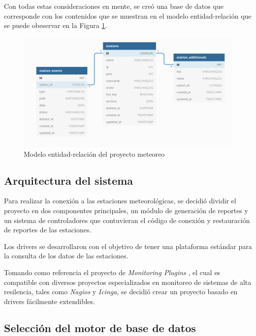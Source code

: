 Con todas estas consideraciones en mente, se creó una base de datos que corresponde con los contenidos que se muestran en el modelo entidad-relación que se puede obeservar en la Figura \ref{fig:diagrama_base_de_datos}.


\begin{figure}[!ht]
	\centering
	\includegraphics[width=0.86\linewidth]{images/diagrams/database_diagram.png}
	\caption{Modelo entidad-relación del proyecto meteoreo}
	\label{fig:diagrama_base_de_datos}
\end{figure}

\subsection{Arquitectura del sistema}

Para realizar la conexión a las estaciones meteorológicas, se decidió dividir el proyecto en dos componentes principales, un módulo de generación de reportes y un sistema de controladores que contuvieran el código de conexión y restauración de reportes de las estaciones.

Los drivers se desarrollaron con el objetivo de tener una plataforma estándar para la consulta de los datos de las estaciones.

Tomando como referencia el proyecto de \textit{Monitoring Plugins} \cite{monitoring_plugins}, el cual es compatible con diversos proyectos especializados en monitoreo de sistemas de alta resilencia, tales como \textit{Nagios} y \textit{Icinga}, se decidió crear un proyecto basado en drivers fácilmente extendibles.


\subsection{Selección del motor de base de datos}

